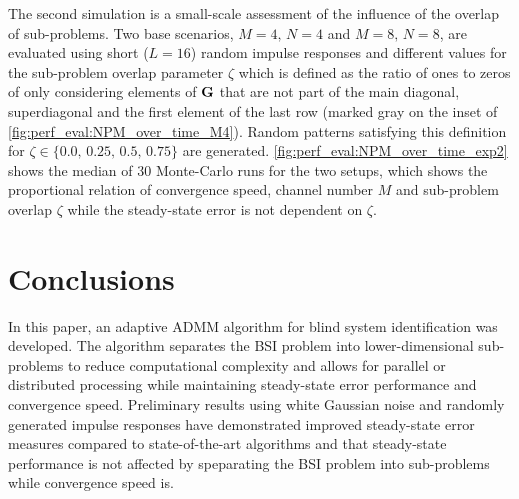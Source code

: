 \documentclass{article}
\begin{document}
The second simulation is a small-scale assessment of the influence of the overlap of sub-problems.
Two base scenarios, \(M=4,\,N=4\) and \(M=8,\,N=8\), are evaluated using short (\(L=16\)) random impulse responses and different values for the sub-problem overlap parameter \(\zeta\) which is defined as the ratio of ones to zeros of only considering elements of \(\bm{\mathrm{G}}\) that are not part of the main diagonal, superdiagonal and the first element of the last row (marked gray on the inset of \autoref{fig:perf_eval:NPM_over_time_M4}).
Random patterns satisfying this definition for \(\zeta \in \{0.0,\,0.25,\,0.5,\,0.75\}\) are generated.
\autoref{fig:perf_eval:NPM_over_time_exp2} shows the median of 30 Monte-Carlo runs for the two setups, which shows the proportional relation of convergence speed, channel number \(M\) and sub-problem overlap \(\zeta\) while the steady-state error is not dependent on \(\zeta\).




\section{Conclusions}
\label{sec:conclusion}
In this paper, an adaptive ADMM algorithm for blind system identification was developed.
The algorithm separates the BSI problem into lower-dimensional sub-problems to reduce computational complexity and allows for parallel or distributed processing while maintaining steady-state error performance and convergence speed.
Preliminary results using white Gaussian noise and randomly generated impulse responses have demonstrated improved steady-state error measures compared to state-of-the-art algorithms and that  steady-state performance is not affected by speparating the BSI problem into sub-problems while convergence speed is.



\end{document}
